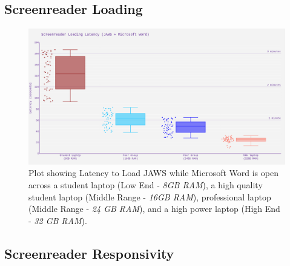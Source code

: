 \documentclass[14pt, letterpaper,twoside]{extreport}
\begin{document}
 \hypertarget{screenreader-loading}{%
\subsection*{Screenreader Loading}\label{screenreader-loading}}

\begin{figure}[!h]
 \centering
 \includegraphics[width=1\linewidth]{images/ComputerRBDisplaySpecsTVIFig1.png}
 \caption[Latency to Load JAWS]{Plot showing Latency to Load JAWS while Microsoft Word is open across a student laptop (Low End - \textit{8GB RAM}), a high quality student laptop (Middle Range - \textit{16GB RAM}), professional laptop (Middle Range - \textit{24 GB RAM}), and a high power laptop (High End - \textit{32 GB RAM}). }
 \label{fig:figre 1}
\end{figure}

\pagebreak \hypertarget{screenreader-response}{%
\subsection*{Screenreader Responsivity}\label{screenreader-response}}
\end{document}
